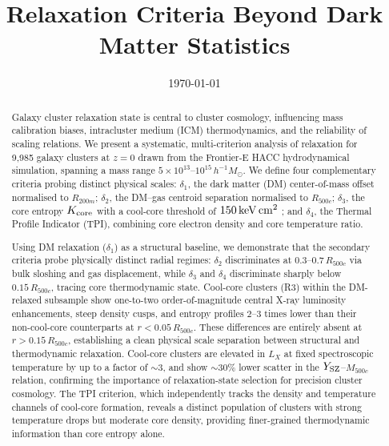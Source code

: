 \documentclass[12pt]{article}
\title{\textbf{Relaxation Criteria Beyond Dark Matter Statistics}}
\date{\today}
\newcommand{\Rfive}{R_{500c}}
\newcommand{\Kcore}{K_{\rm core}}
\newcommand{\deltai}{\delta_1}
\newcommand{\deltaii}{\delta_2}
\newcommand{\deltaiii}{\delta_3}
\newcommand{\deltaiv}{\delta_4}
\newcommand{\kevcm}{{\rm keV\,cm^2}}
\newcommand{\Msun}{M_\odot}
\begin{document}
\maketitle

\begin{abstract}
Galaxy cluster relaxation state is central to cluster cosmology, influencing mass
calibration biases, intracluster medium (ICM) thermodynamics, and the reliability of
scaling relations.  We present a systematic, multi-criterion analysis of relaxation for
9{,}985 galaxy clusters at $z=0$ drawn from the Frontier-E HACC hydrodynamical
simulation, spanning a mass range $5\times10^{13}$--$10^{15}\,h^{-1}\Msun$.  We define
four complementary criteria probing distinct physical scales: $\deltai$, the dark matter
(DM) center-of-mass offset normalised to $R_{200m}$; $\deltaii$, the DM--gas centroid
separation normalised to $R_{500c}$; $\deltaiii$, the core entropy $\Kcore$ with a
cool-core threshold of $150\,\kevcm$ \citep{hudson2010}; and $\deltaiv$, the Thermal
Profile Indicator (TPI), combining core electron density and core temperature ratio.

Using DM relaxation ($\deltai$) as a structural baseline, we demonstrate that the
secondary criteria probe physically distinct radial regimes: $\deltaii$ discriminates
at $0.3$--$0.7\,\Rfive$ via bulk sloshing and gas displacement, while $\deltaiii$ and
$\deltaiv$ discriminate sharply below $0.15\,\Rfive$, tracing core thermodynamic state.
Cool-core clusters (R3) within the DM-relaxed subsample show one-to-two order-of-magnitude
central X-ray luminosity enhancements, steep density cusps, and entropy profiles $2$--$3$
times lower than their non-cool-core counterparts at $r < 0.05\,\Rfive$.
These differences are entirely absent at $r > 0.15\,\Rfive$, establishing a clean
physical scale separation between structural and thermodynamic relaxation.
Cool-core clusters are elevated in $L_X$ at fixed spectroscopic temperature by up to a
factor of $\sim$3, and show $\sim$30\% lower scatter in the $Y_{\rm SZ}$--$M_{500c}$
relation, confirming the importance of relaxation-state selection for precision cluster
cosmology.  The TPI criterion, which independently tracks the density and temperature
channels of cool-core formation, reveals a distinct population of clusters with strong
temperature drops but moderate core density, providing finer-grained thermodynamic
information than core entropy alone.
\end{abstract}
\end{document}

